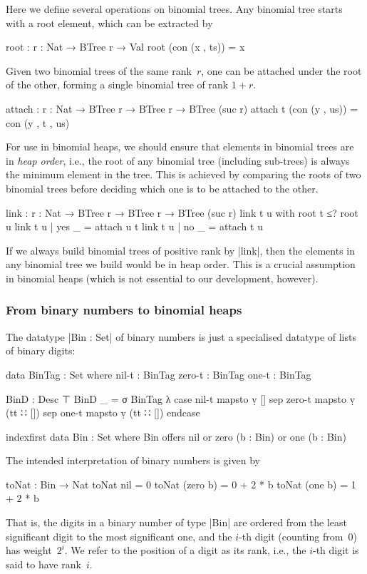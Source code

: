 Here we define several operations on binomial trees.
Any binomial tree starts with a root element, which can be extracted by
\begin{code}
root : {r : Nat} → BTree r → Val
root (con (x , ts)) = x
\end{code}
Given two binomial trees of the same rank~$r$, one can be attached under the root of the other, forming a single binomial tree of rank $1+r$.
\begin{code}
attach : {r : Nat} → BTree r → BTree r → BTree (suc r)
attach t (con (y , us)) = con (y , t , us)
\end{code}
For use in binomial heaps, we should ensure that elements in binomial trees are in \emph{heap order}, i.e., the root of any binomial tree (including sub-trees) is always the minimum element in the tree.
This is achieved by comparing the roots of two binomial trees before deciding which one is to be attached to the other.
\begin{code}
link : {r : Nat} → BTree r → BTree r → BTree (suc r)
link t u with root t ≤? root u
link t u | yes  _ = attach u t
link t u | no   _ = attach t u
\end{code}
If we always build binomial trees of positive rank by |link|, then the elements in any binomial tree we build would be in heap order.
This is a crucial assumption in binomial heaps (which is not essential to our development, however).

\subsubsection{From binary numbers to binomial heaps}
The datatype |Bin : Set| of binary numbers is just a specialised datatype of lists of binary digits:
\begin{code}
data BinTag : Set where
  nil-t   : BinTag
  zero-t  : BinTag
  one-t   : BinTag

BinD : Desc ⊤
BinD _ = σ BinTag λ  case  nil-t   mapsto  ṿ []
                     sep   zero-t  mapsto  ṿ (tt ∷ [])
                     sep   one-t   mapsto  ṿ (tt ∷ []) endcase

indexfirst data Bin : Set where
  Bin  offers  nil
       or      zero   (b : Bin)
       or      one    (b : Bin)
\end{code}
The intended interpretation of binary numbers is given by
\begin{code}
toNat : Bin → Nat
toNat nil        = 0
toNat (zero  b)  = 0 + 2 * b
toNat (one   b)  = 1 + 2 * b
\end{code}
That is, the digits in a binary number of type |Bin| are ordered from the least significant digit to the most significant one, and the $i$-th digit (counting from~$0$) has weight~$2^i$.
We refer to the position of a digit as its rank, i.e., the $i$-th digit is said to have rank~$i$.

